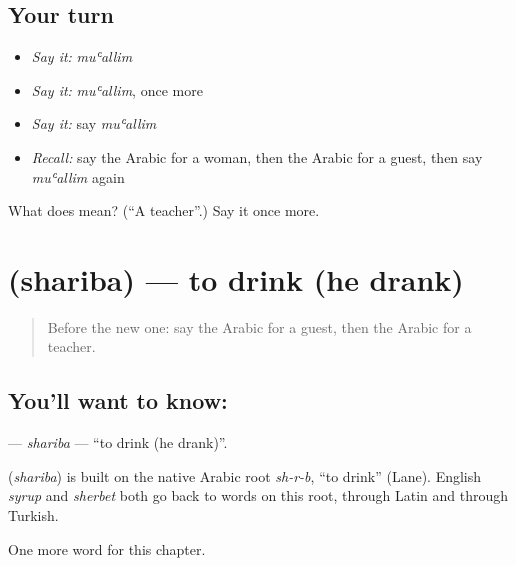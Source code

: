 \subsection*{Your turn}
\begin{itemize}
\raggedright
  \item \emph{Say it:} \emph{muʿallim}
  \item \emph{Say it:} \emph{muʿallim}, once more
  \item \emph{Say it:} say \emph{muʿallim}
  \item \emph{Recall:} say the Arabic for a woman, then the Arabic for a guest, then say \emph{muʿallim} again
\end{itemize}

\begin{tcolorbox}[breakable,colback=teal!4,colframe=teal!35!black,title={Before you move on}]
What does  mean? (\textquotedblleft{}A teacher\textquotedblright{}.) Say it once more.
\end{tcolorbox}
\section[\texorpdfstring{\ar{شرب} (shariba)}{شرب (shariba)}]{ (shariba) — to drink (he drank)}

\label{lesson:AR-C57-shariba}



\begin{quote}
Before the new one: say the Arabic for a guest, then the Arabic for a teacher.
\end{quote}

\subsection*{You'll want to know: }
\textbf{} — \emph{shariba} — \textquotedblleft{}to drink (he drank)\textquotedblright{}.

\begin{cousinweb}
\textbf{} (\emph{shariba}) is built on the native Arabic root \emph{sh-r-b}, \textquotedblleft{}to drink\textquotedblright{} (Lane). English \emph{syrup} and \emph{sherbet} both go back to words on this root, through Latin and through Turkish.
\end{cousinweb}

\begin{grammarlens}[title={What you've built}]
One more word for this chapter.
\end{grammarlens}

